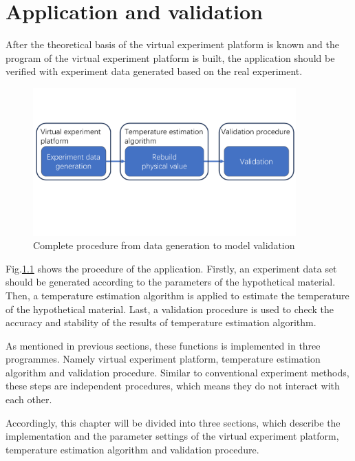 \chapter{Application and validation}

After the theoretical basis of the virtual experiment platform is known and 
the program of the virtual experiment platform is built, the application should be 
verified with experiment data generated based on the real experiment.


\begin{figure}[htbp]
    \centering
    \includegraphics[width=0.90\textwidth]{figures/application_procedure.pdf}
    \caption{Complete procedure from data generation to model validation}
    \label{fig: application_procedure}
\end{figure}


Fig.\ref{fig: application_procedure} shows the procedure of the application.
Firstly, an experiment data set should be generated according to the parameters of the 
hypothetical material. Then, a temperature estimation algorithm is applied to 
estimate the temperature of the hypothetical material. Last, a validation procedure 
is used to check the accuracy and stability of the results of 
temperature estimation algorithm.


As mentioned in previous sections, these functions is implemented in three 
programmes. Namely virtual experiment platform, temperature estimation algorithm
and validation procedure. Similar to conventional experiment methods, these
steps are independent procedures, which means they do not interact with 
each other. 


Accordingly, this chapter will be divided into three sections, which describe 
the implementation and the parameter settings of the virtual experiment platform, 
temperature estimation algorithm and validation procedure.



